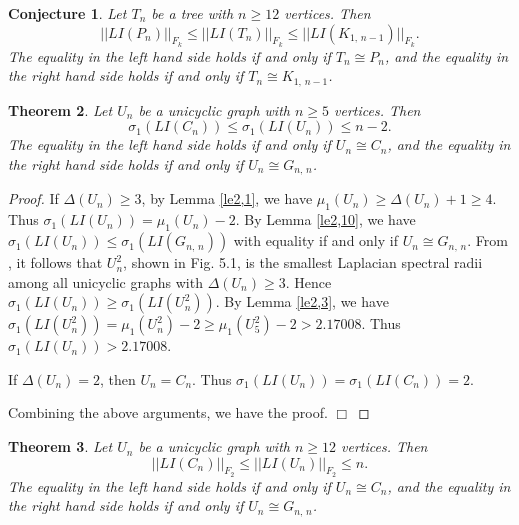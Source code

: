 \documentclass[12pt, a4paper]{article}
\newtheorem{theorem}{Theorem}[section]
\newtheorem{conjecture}[theorem]{Conjecture}
\begin{document}
\begin{conjecture}
Let $T_n$ be a tree with $n\geq 12$ vertices. Then
$$||LI(P_n)||_{F_k}\leq ||LI(T_n)||_{F_k}\leq ||LI(K_{1, \, n-1})||_{F_k}.$$
The equality in the left hand side holds if and only if $T_n\cong P_n$, and the equality in the right hand side holds if and only if $T_n\cong K_{1,\,n-1}$.
\end{conjecture}




\begin{theorem}\label{th5,4} %
Let $U_n$ be a unicyclic graph with $n\geq 5$ vertices. Then
$$\sigma_1(LI(C_n))\leq \sigma_1(LI(U_n))\leq n-2.$$
The equality in the left hand side holds if and only if $U_n\cong C_n$, and the equality in the right hand side holds if and only if $U_n\cong G_{n,\,n}$.
\end{theorem}

\begin{proof} If $\Delta(U_n)\geq 3$, by Lemma \ref{le2,1}, we have $\mu_1(U_n)\geq \Delta(U_n)+1\geq 4$. Thus $\sigma_1(LI(U_n))=\mu_1(U_n)-2$. By Lemma \ref{le2,10}, we have $\sigma_1(LI(U_n))\leq \sigma_1(LI(G_{n,\,n}))$ with equality if and only if $U_n\cong G_{n,\,n}$. From \cite{SSG}, it follows that $U_n^2$, shown in Fig. 5.1, is the smallest Laplacian spectral radii among all unicyclic graphs with $\Delta(U_n)\geq 3$. Hence $\sigma_1(LI(U_n))\geq \sigma_1(LI(U_n^2))$. By Lemma \ref{le2,3}, we have $\sigma_1(LI(U_n^2))=\mu_1(U_n^2)-2\geq \mu_1(U_5^2)-2> 2.17008$. Thus $\sigma_1(LI(U_n))> 2.17008$.

If $\Delta(U_n)=2$, then $U_n=C_n$. Thus $\sigma_1(LI(U_n))=\sigma_1(LI(C_n))=2$.

Combining the above arguments, we have the proof. $\Box$

\end{proof}

\begin{theorem}\label{th5,5} %
Let $U_n$ be a unicyclic graph with $n\geq 12$ vertices. Then
$$||LI(C_n)||_{F_2} \leq ||LI(U_n)||_{F_2}\leq n.$$
The equality in the left hand side holds if and only if $U_n\cong C_n$, and the equality in the right hand side holds if and only if $U_n\cong G_{n,\,n}$.
\end{theorem}
\end{document}
